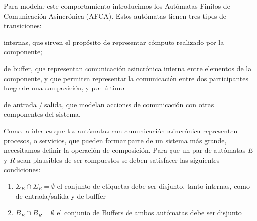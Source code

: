 Para modelar este comportamiento introducimos los Autómatas Finitos de Comunicación Asincrónica (AFCA). Estos autómatas tienen tres tipos de transiciones: 
\begin{inparaenum}[1)]
\item internas, que sirven el propósito de representar cómputo realizado por la componente; 
\item de buffer, que representan comunicación asincrónica interna entre elementos de la componente, y que permiten representar la comunicación entre dos participantes luego de una composición; y por último 
\item de antrada / salida, que modelan acciones de comunicación con otras componentes del sistema.
\end{inparaenum}

Como la idea es que los autómatas con comunicación asincrónica representen procesos, o servicios, que pueden formar parte de un sistema más grande, necesitamos definir la operación de composición. Para que un par de autómatas $E$ y $R$ sean plausibles de ser compuestos se deben satisfacer las siguientes condiciones:
 \begin{enumerate}
\item $\Sigma_E \cap \Sigma_R = \emptyset$ el conjunto de etiquetas debe ser disjunto, tanto internas, como de entrada/salida y de bufffer
\item $ B_E \cap B_R = \emptyset$ el conjunto de Buffers de ambos autómatas debe ser disjunto  
\end{enumerate}
